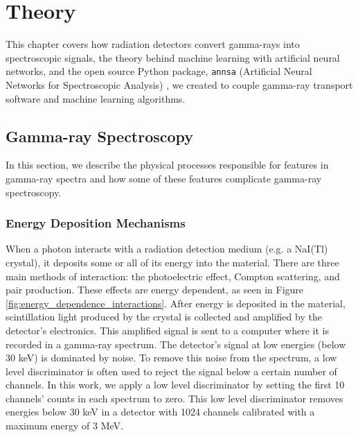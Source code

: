 \chapter{Theory} \label{theory}

This chapter covers how radiation detectors convert gamma-rays into spectroscopic signals, the theory behind machine learning with artificial neural networks, and the open source Python package, \verb|annsa| (Artificial Neural Networks for Spectroscopic Analysis) \cite{annsa}, we created to couple gamma-ray transport software and machine learning algorithms.

\section{Gamma-ray Spectroscopy}

In this section, we describe the physical processes responsible for features in gamma-ray spectra and how some of these features complicate gamma-ray spectroscopy.


\subsection{Energy Deposition Mechanisms}

When a photon interacts with a radiation detection medium (e.g. a NaI(Tl) crystal), it deposits some or all of its energy into the material. There are three main methods of interaction: the photoelectric effect, Compton scattering, and pair production. These effects are energy dependent, as seen in Figure \ref{fig:energy_dependence_interactions}. After energy is deposited in the material, scintillation light produced by the crystal is collected and amplified by the detector's electronics. This amplified signal is sent to a computer where it is recorded in a gamma-ray spectrum. The detector's signal at low energies (below 30 keV) is dominated by noise. To remove this noise from the spectrum, a low level discriminator is often used to reject the signal below a certain number of channels. In this work, we apply a low level discriminator by setting the first 10 channels' counts in each spectrum to zero. This low level discriminator removes energies below 30 keV in a detector with 1024 channels calibrated with a maximum energy of 3 MeV.

